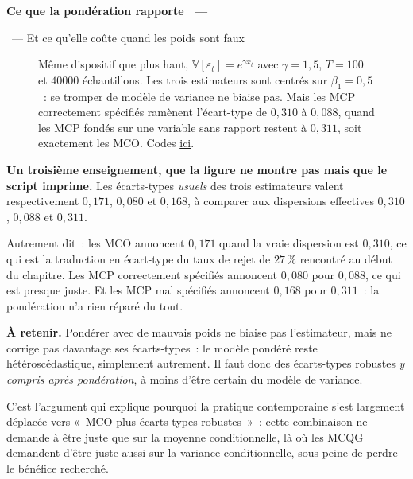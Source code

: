 \documentclass[10pt,a4paper]{article}
\makeatletter
\newcommand{\coursfile}{chapitre-4}
\newcommand{\HEAD}{HEAD}%
\newcommand{\repourl}{https://github.com/stepan-a/econometrics}
\newcommand{\coderef}[1]{\href{\repourl/blob/\HEAD/routines/\coursfile/#1}{ici}}
\theoremstyle{definition}
\newenvironment{frame}[1][]{\par}{\par}
\newcommand{\frameheadrule}{%
  \par\nobreak\vspace{1pt}{\color{ctitle}\hrule height 0.6pt}\nobreak\vspace{4pt}}
\newcommand{\frametitle}[1]{%
  \par\addvspace{8pt plus 2pt}\needspace{6\baselineskip}%
  \noindent\begingroup\color{ctitle}\sffamily\bfseries\large #1\endgroup
  \@ifnextchar\framesubtitle{}{\frameheadrule}}
\newcommand{\framesubtitle}[1]{%
  \begingroup\color{ctitle}\sffamily\normalsize\ --- #1\endgroup\frameheadrule}
\newcommand{\dnote}[1]{\begin{notebox}\footnotesize\textbf{À retenir. }#1\end{notebox}}
\makeatother
\begin{document}
\begin{frame}[c]
  \frametitle{Ce que la pondération rapporte}
  \framesubtitle{Et ce qu'elle coûte quand les poids sont faux}

  \begin{figure}
    \centering
    \caption{Même dispositif que plus haut,
      $\mathbb V[\varepsilon_t]=e^{\gamma x_t}$ avec $\gamma=1{,}5$, $T=100$ et
      $40000$ échantillons. Les trois estimateurs sont centrés sur $\beta_1=0{,}5$~:
      se tromper de modèle de variance ne biaise pas. Mais les MCP correctement
      spécifiés ramènent l'écart-type de $0{,}310$ à $0{,}088$, quand les MCP
      fondés sur une variable sans rapport restent à $0{,}311$, soit exactement
      les MCO\@. Codes \coderef{mcp-vs-mco.py}.}
  \end{figure}

\end{frame}


\begin{notes}

  \textbf{Un troisième enseignement, que la figure ne montre pas mais que le
    script imprime.} Les écarts-types \emph{usuels} des trois estimateurs valent
  respectivement $0{,}171$, $0{,}080$ et $0{,}168$, à comparer aux dispersions
  effectives $0{,}310$, $0{,}088$ et $0{,}311$.

  \bigskip

  Autrement dit~: les MCO annoncent $0{,}171$ quand la vraie dispersion est
  $0{,}310$, ce qui est la traduction en écart-type du taux de rejet de $27\,\%$
  rencontré au début du chapitre. Les MCP correctement spécifiés annoncent
  $0{,}080$ pour $0{,}088$, ce qui est presque juste. Et les MCP mal spécifiés
  annoncent $0{,}168$ pour $0{,}311$~: la pondération n'a rien réparé du tout.

  \bigskip

  \dnote{Pondérer avec de mauvais poids ne biaise pas l'estimateur, mais ne
    corrige pas davantage ses écarts-types~: le modèle pondéré reste
    hétéroscédastique, simplement autrement. Il faut donc des écarts-types
    robustes \emph{y compris après pondération}, à moins d'être certain du
    modèle de variance.}

  \bigskip

  C'est l'argument qui explique pourquoi la pratique contemporaine s'est
  largement déplacée vers «~MCO plus écarts-types robustes~»~: cette
  combinaison ne demande à être juste que sur la moyenne conditionnelle, là où
  les MCQG demandent d'être juste aussi sur la variance conditionnelle, sous
  peine de perdre le bénéfice recherché.

\end{notes}
\end{document}
